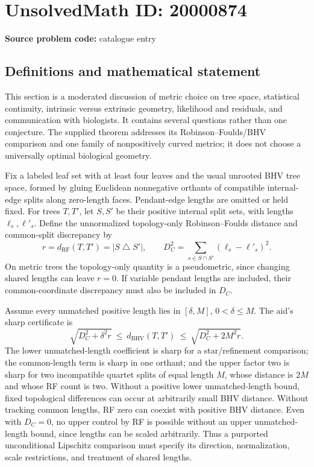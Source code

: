 \documentclass[11pt]{article}
\begin{document}
\section*{UnsolvedMath ID: 20000874}
\textbf{Source problem code:} catalogue entry
\subsection{Definitions and mathematical statement}
This section is a moderated discussion of metric choice on tree space, statistical continuity, intrinsic versus extrinsic geometry, likelihood and residuals, and communication with biologists. It contains several questions rather than one conjecture. The supplied theorem addresses its Robinson--Foulds/BHV comparison and one family of nonpositively curved metrics; it does not choose a universally optimal biological geometry.

Fix a labeled leaf set with at least four leaves and the usual unrooted BHV tree space, formed by gluing Euclidean nonnegative orthants of compatible internal-edge splits along zero-length faces. Pendant-edge lengths are omitted or held fixed. For trees \(T,T'\), let \(S,S'\) be their positive internal split sets, with lengths \(\ell_s,\ell'_s\). Define the unnormalized topology-only Robinson--Foulds distance and common-split discrepancy by
\[
 r=d_{\mathrm{RF}}(T,T')=|S\mathbin{\triangle}S'|,\qquad
 D_C^2=\sum_{s\in S\cap S'}(\ell_s-\ell'_s)^2.
\]
On metric trees the topology-only quantity is a pseudometric, since changing shared lengths can leave \(r=0\). If variable pendant lengths are included, their common-coordinate discrepancy must also be included in \(D_C\).

Assume every unmatched positive length lies in \([\delta,M]\), \(0<\delta\leq M\). The aid's sharp certificate is
\[
 \sqrt{D_C^2+\delta^2r}\ \leq\ d_{\mathrm{BHV}}(T,T')
 \ \leq\ \sqrt{D_C^2+2M^2r}.
\]
The lower unmatched-length coefficient is sharp for a star/refinement comparison; the common-length term is sharp in one orthant; and the upper factor two is sharp for two incompatible quartet splits of equal length \(M\), whose distance is \(2M\) and whose RF count is two. Without a positive lower unmatched-length bound, fixed topological differences can occur at arbitrarily small BHV distance. Without tracking common lengths, RF zero can coexist with positive BHV distance. Even with \(D_C=0\), no upper control by RF is possible without an upper unmatched-length bound, since lengths can be scaled arbitrarily. Thus a purported unconditional Lipschitz comparison must specify its direction, normalization, scale restrictions, and treatment of shared lengths.
\end{document}

